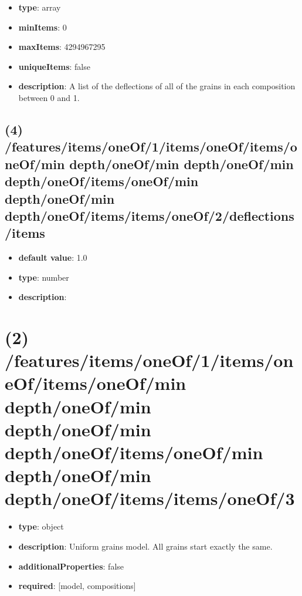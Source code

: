 \begin{itemize}[leftmargin=3em]\item {\bf type}: array
\item {\bf minItems}: 0
\item {\bf maxItems}: 4294967295
\item {\bf uniqueItems}: false
\item {\bf description}: A list of the deflections of all of the grains in each composition between 0 and 1.
\end{itemize}\subsection{(4) /features/items/oneOf/1/items/oneOf/items/oneOf/min depth/oneOf/min depth/oneOf/min depth/oneOf/items/oneOf/min depth/oneOf/min depth/oneOf/items/items/oneOf/2/deflections/items}
\begin{itemize}[leftmargin=4em]\item {\bf default value}: 1.0
\item {\bf type}: number
\item {\bf description}: 
\end{itemize}\section{(2) /features/items/oneOf/1/items/oneOf/items/oneOf/min depth/oneOf/min depth/oneOf/min depth/oneOf/items/oneOf/min depth/oneOf/min depth/oneOf/items/items/oneOf/3}
\begin{itemize}[leftmargin=2em]\item {\bf type}: object
\item {\bf description}: Uniform grains model. All grains start exactly the same.
\item {\bf additionalProperties}: false
\item {\bf required}: [model, compositions]\end{itemize}
